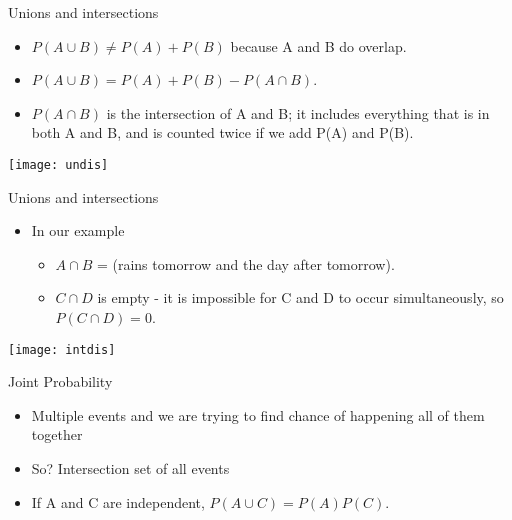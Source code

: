 \begin{frame}{Unions and intersections }

\begin{itemize}
\item $P(A \cup B) \neq P(A) + P(B)$ because A and B do overlap. 
\item$ P(A \cup B) =P(A) + P(B) - P(A \cap B)$. 
\item   $P(A \cap B)$ is the intersection of A and B; it includes everything that is in 
both A and B, and is counted twice if we add P(A) and P(B). 
\end{itemize}

\begin{center}
\texttt{[image: undis]}
\end{center}
\end{frame}

\begin{frame}{Unions and intersections }
\begin{itemize}
\item In our example  
\begin{itemize}
\item $A \cap B$  = (rains tomorrow and the day after tomorrow).  
\item  $C \cap D$  is empty - it is impossible for C and D to occur 
simultaneously, so $P(C \cap D)= 0$. 
\end{itemize}

\end{itemize}
\begin{center}
\texttt{[image: intdis]}
\end{center}
\end{frame}

\begin{frame}{Joint Probability}

\begin{itemize}
\item Multiple events and we are trying to find chance of happening all of them together
\item So? Intersection set of all events
\item  If A and C are independent, $P(A \cup C) = P(A)P(C)$. 
\end{itemize}
\end{frame}



